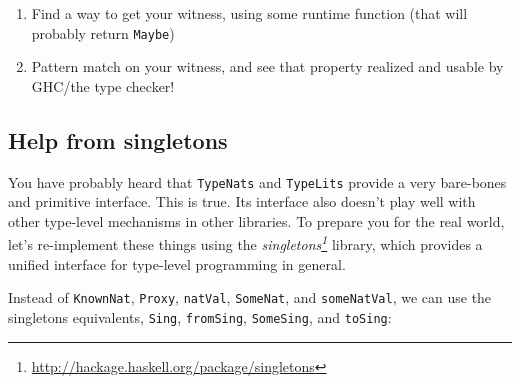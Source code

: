 \documentclass[]{article}
\renewcommand{\href}[2]{#2\footnote{\url{#1}}}
\begin{document}
\begin{enumerate}
\def\labelenumi{\arabic{enumi}.}
\tightlist
\item
  Find a way to get your witness, using some runtime function (that will
  probably return \texttt{Maybe})
\item
  Pattern match on your witness, and see that property realized and usable by
  GHC/the type checker!
\end{enumerate}

\subsection{Help from singletons}\label{help-from-singletons}

You have probably heard that \texttt{TypeNats} and \texttt{TypeLits} provide a
very bare-bones and primitive interface. This is true. Its interface also
doesn't play well with other type-level mechanisms in other libraries. To
prepare you for the real world, let's re-implement these things using the
\emph{\href{http://hackage.haskell.org/package/singletons}{singletons}} library,
which provides a unified interface for type-level programming in general.

Instead of \texttt{KnownNat}, \texttt{Proxy}, \texttt{natVal}, \texttt{SomeNat},
and \texttt{someNatVal}, we can use the singletons equivalents, \texttt{Sing},
\texttt{fromSing}, \texttt{SomeSing}, and \texttt{toSing}:
\end{document}

